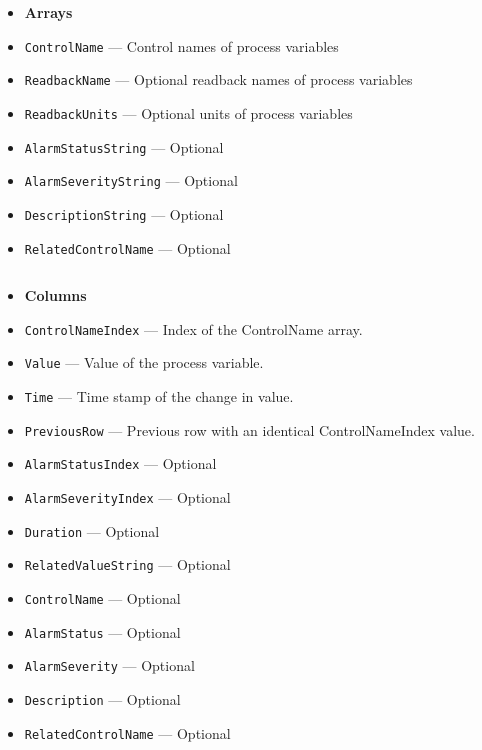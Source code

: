 \begin{itemize}
\begin{itemize}
\begin{verbatim}
\end{verbatim}
\begin{itemize}
        \item {\bf Arrays}
        \item {\tt ControlName} --- Control names of process variables
        \item {\tt ReadbackName} --- Optional readback names of process variables
        \item {\tt ReadbackUnits} --- Optional units of process variables
        \item {\tt AlarmStatusString} --- Optional
        \item {\tt AlarmSeverityString} --- Optional
        \item {\tt DescriptionString} --- Optional
        \item {\tt RelatedControlName} --- Optional
\end{itemize}
\begin{verbatim}

\end{verbatim}
\begin{itemize}
        \item {\bf Columns}
        \item {\tt ControlNameIndex} --- Index of the ControlName array.
        \item {\tt Value} --- Value of the process variable.
        \item {\tt Time} --- Time stamp of the change in value.
        \item {\tt PreviousRow} --- Previous row with an identical ControlNameIndex value.
        \item {\tt AlarmStatusIndex} --- Optional
        \item {\tt AlarmSeverityIndex} --- Optional
        \item {\tt Duration} --- Optional
        \item {\tt RelatedValueString} --- Optional
        \item {\tt ControlName} --- Optional
        \item {\tt AlarmStatus} --- Optional
        \item {\tt AlarmSeverity} --- Optional
        \item {\tt Description} --- Optional
        \item {\tt RelatedControlName} --- Optional

\end{itemize}

\end{itemize}


\end{itemize}
